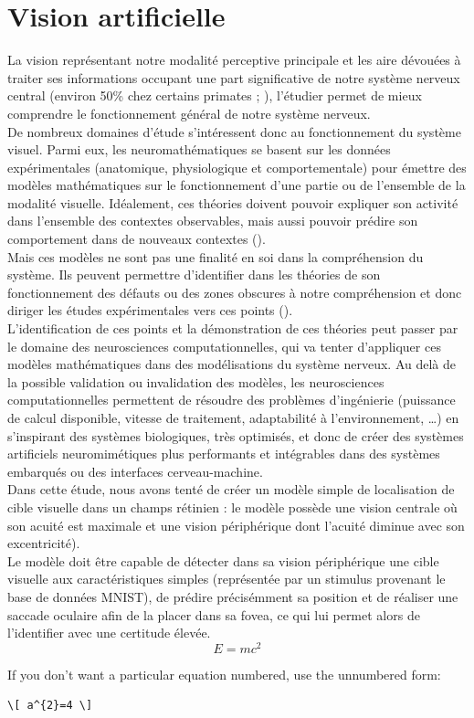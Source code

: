 \section{Vision artificielle}
La vision représentant notre modalité perceptive principale et les aire dévouées à traiter ses informations occupant une part significative de notre système nerveux central (environ 50\% chez certains primates ; \cite{Zhaoping2014}), l'étudier permet de mieux comprendre le fonctionnement général de notre système nerveux.\\
De nombreux domaines d'étude s'intéressent donc au fonctionnement du système visuel. Parmi eux, les neuromathématiques se basent sur les données expérimentales (anatomique, physiologique et comportementale) pour émettre des modèles mathématiques sur le fonctionnement d'une partie ou de l'ensemble de la modalité visuelle. Idéalement, ces théories doivent pouvoir expliquer son activité dans l'ensemble des contextes observables, mais aussi pouvoir prédire son comportement dans de nouveaux contextes (\cite{Zhaoping2014}).\\
Mais ces modèles ne sont pas une finalité en soi dans la compréhension du système. Ils peuvent permettre d'identifier dans les théories de son fonctionnement des défauts ou des zones obscures à notre compréhension et donc diriger les études expérimentales vers ces points (\cite{Zhaoping2014}).\\
L'identification de ces points et la démonstration de ces théories peut passer par le domaine des neurosciences computationnelles, qui va tenter d'appliquer ces modèles mathématiques dans des modélisations du système nerveux. Au delà de la possible validation ou invalidation des modèles, les neurosciences computationnelles permettent de résoudre des problèmes d'ingénierie (puissance de calcul disponible, vitesse de traitement, adaptabilité à l'environnement, \ldots) en s'inspirant des systèmes biologiques, très optimisés, et donc de créer des systèmes artificiels neuromimétiques plus performants et intégrables dans des systèmes embarqués ou des interfaces cerveau-machine.\\

Dans cette étude, nous avons tenté de créer un modèle simple de localisation de cible visuelle dans un champs rétinien : le modèle possède une vision centrale où son acuité est maximale et une vision périphérique dont l'acuité diminue avec son excentricité).\\
Le modèle doit être capable de détecter dans sa vision périphérique une cible visuelle aux caractéristiques simples (représentée par un stimulus provenant le base de données MNIST), de prédire précisémment sa position et de réaliser une saccade oculaire afin de la placer dans sa fovea, ce qui lui permet alors de l'identifier avec une certitude élevée.\\

\begin{equation}
E = mc^{2}
\label{eqn:Einstein}
\end{equation}

If you don't want a particular equation numbered, use the unnumbered form:
\begin{verbatim}
\[ a^{2}=4 \]
\end{verbatim}
